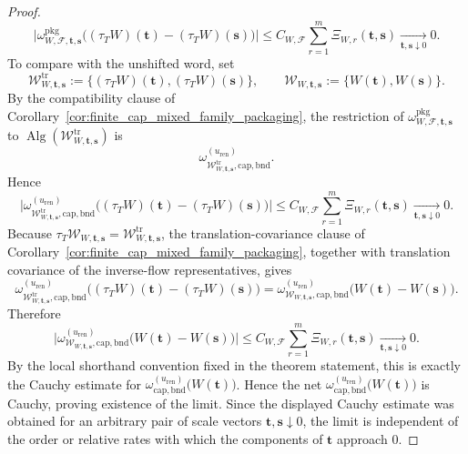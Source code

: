 \begin{proof}
\[
\bigl|
\omega_{W,\mathcal F,\mathbf t,\mathbf s}^{\mathrm{pkg}}\bigl((\tau_T W)(\mathbf t)-(\tau_T W)(\mathbf s)\bigr)
\bigr|
\le
C_{W,\mathcal F}\sum_{r=1}^m \Xi_{W,r}(\mathbf t,\mathbf s)
\xrightarrow[\mathbf t,\mathbf s\downarrow 0]{}0.
\]
To compare with the unshifted word, set
\[
\mathcal W_{W,\mathbf t,\mathbf s}^{\mathrm{tr}}
:=
\{(\tau_TW)(\mathbf t),(\tau_TW)(\mathbf s)\},
\qquad
\mathcal W_{W,\mathbf t,\mathbf s}
:=
\{W(\mathbf t),W(\mathbf s)\}.
\]
By the compatibility clause of Corollary~\ref{cor:finite_cap_mixed_family_packaging}, the restriction of $\omega_{W,\mathcal F,\mathbf t,\mathbf s}^{\mathrm{pkg}}$ to $\operatorname{Alg}(\mathcal W_{W,\mathbf t,\mathbf s}^{\mathrm{tr}})$ is
\[
\omega_{\mathcal W_{W,\mathbf t,\mathbf s}^{\mathrm{tr}},\mathrm{cap,bnd}}^{(u_{\mathrm{ren}})}.
\]
Hence
\[
\bigl|
\omega_{\mathcal W_{W,\mathbf t,\mathbf s}^{\mathrm{tr}},\mathrm{cap,bnd}}^{(u_{\mathrm{ren}})}\bigl((\tau_T W)(\mathbf t)-(\tau_T W)(\mathbf s)\bigr)
\bigr|
\le
C_{W,\mathcal F}\sum_{r=1}^m \Xi_{W,r}(\mathbf t,\mathbf s)
\xrightarrow[\mathbf t,\mathbf s\downarrow 0]{}0.
\]
Because $\tau_T\mathcal W_{W,\mathbf t,\mathbf s}=\mathcal W_{W,\mathbf t,\mathbf s}^{\mathrm{tr}}$, the translation-covariance clause of Corollary~\ref{cor:finite_cap_mixed_family_packaging}, together with translation covariance of the inverse-flow representatives, gives
\[
\omega_{\mathcal W_{W,\mathbf t,\mathbf s}^{\mathrm{tr}},\mathrm{cap,bnd}}^{(u_{\mathrm{ren}})}\bigl((\tau_T W)(\mathbf t)-(\tau_T W)(\mathbf s)\bigr)
=
\omega_{\mathcal W_{W,\mathbf t,\mathbf s},\mathrm{cap,bnd}}^{(u_{\mathrm{ren}})}\bigl(W(\mathbf t)-W(\mathbf s)\bigr).
\]
Therefore
\[
\bigl|
\omega_{\mathcal W_{W,\mathbf t,\mathbf s},\mathrm{cap,bnd}}^{(u_{\mathrm{ren}})}\bigl(W(\mathbf t)-W(\mathbf s)\bigr)
\bigr|
\le
C_{W,\mathcal F}\sum_{r=1}^m \Xi_{W,r}(\mathbf t,\mathbf s)
\xrightarrow[\mathbf t,\mathbf s\downarrow 0]{}0.
\]
By the local shorthand convention fixed in the theorem statement, this is exactly the Cauchy estimate for $\omega_{\mathrm{cap,bnd}}^{(u_{\mathrm{ren}})}\bigl(W(\mathbf t)\bigr)$.
Hence the net $\omega_{\mathrm{cap,bnd}}^{(u_{\mathrm{ren}})}\bigl(W(\mathbf t)\bigr)$ is Cauchy, proving existence of the limit.
Since the displayed Cauchy estimate was obtained for an arbitrary pair of scale vectors $\mathbf t,\mathbf s\downarrow 0$, the limit is independent of the order or relative rates with which the components of $\mathbf t$ approach $0$.


\end{proof}
